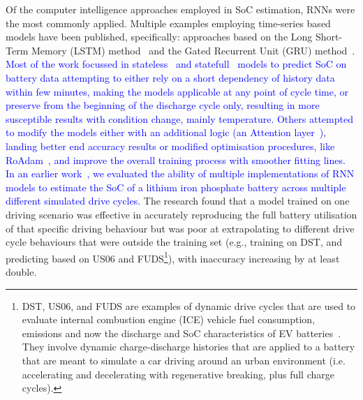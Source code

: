 %
%
Of the computer intelligence approaches employed in SoC estimation, RNNs were the most commonly applied.
Multiple examples employing time-series based models have been published, specifically: approaches based on the Long Short-Term Memory (LSTM) method~\cite{Chemali2017,mamo_long_2020,zhang_deep_2020} and the Gated Recurrent Unit (GRU) method~\cite{song_lithium-ion_2018,jiao_gru-rnn_2020,xiao_accurate_2019,javid_adaptive_2020}.
\textcolor{blue}{Most of the work focussed in stateless~\cite{Chemali2017,javid_adaptive_2020,zhang_deep_2020} and statefull~\cite{song_lithium-ion_2018,jiao_gru-rnn_2020,xiao_accurate_2019} models to predict SoC on battery data attempting to either rely on a short dependency of history data within few minutes, making the models applicable at any point of cycle time, or preserve from the beginning of the discharge cycle only, resulting in more susceptible results with condition change, mainly temperature.
Others attempted to modify the models either with an additional logic (an Attention layer~\cite{mamo_long_2020}), landing better end accuracy results or modified optimisation procedures, like RoAdam~\cite{javid_adaptive_2020}, and improve the overall training process with smoother fitting lines.
In an earlier work~\cite{sadykov_practical_2022}, we evaluated the ability of multiple implementations of RNN models to estimate the SoC of a lithium iron phosphate battery across multiple different simulated drive cycles.}
The research found that a model trained on one driving scenario was effective in accurately reproducing the full battery utilisation of that specific driving behaviour but was poor at extrapolating to different drive cycle behaviours that were outside the training set (e.g., training on DST, and predicting based on US06 and FUDS\footnote{DST, US06, and FUDS are examples of dynamic drive cycles that are used to evaluate internal combustion engine (ICE) vehicle fuel consumption, emissions and now the discharge and SoC characteristics of EV batteries~\cite{castillo_18_2015}. They involve dynamic charge-discharge histories that are applied to a battery that are meant to simulate a car driving around an urban environment (i.e. accelerating and decelerating with regenerative breaking, plus full charge cycles).}), with inaccuracy increasing by at least double.
